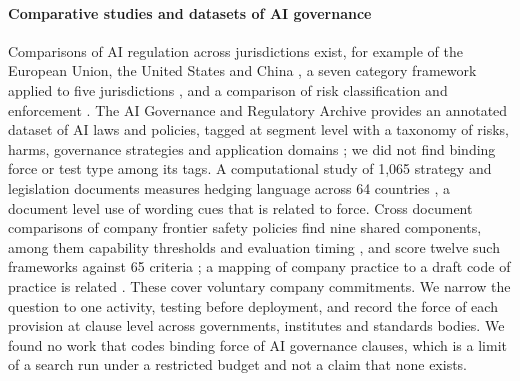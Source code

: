 \documentclass[conference]{IEEEtran}
\begin{document}
\paragraph{Comparative studies and datasets of AI governance} Comparisons of AI regulation across jurisdictions exist, for example of the European Union, the United States and China \citep{chun2024comparative,du2025toward}, a seven category framework applied to five jurisdictions \citep{roberts2023comparative}, and a comparison of risk classification and enforcement \citep{almaamari2025between}. The AI Governance and Regulatory Archive provides an annotated dataset of AI laws and policies, tagged at segment level with a taxonomy of risks, harms, governance strategies and application domains \citep{arnold2024agora}; we did not find binding force or test type among its tags. A computational study of 1,065 strategy and legislation documents measures hedging language across 64 countries \citep{silva2024decoding}, a document level use of wording cues that is related to force. Cross document comparisons of company frontier safety policies find nine shared components, among them capability thresholds and evaluation timing \citep{metr2025common}, and score twelve such frameworks against 65 criteria \citep{stelling2025evaluating}; a mapping of company practice to a draft code of practice is related \citep{stelling2025mapping}. These cover voluntary company commitments. We narrow the question to one activity, testing before deployment, and record the force of each provision at clause level across governments, institutes and standards bodies. We found no work that codes binding force of AI governance clauses, which is a limit of a search run under a restricted budget and not a claim that none exists.
\end{document}

